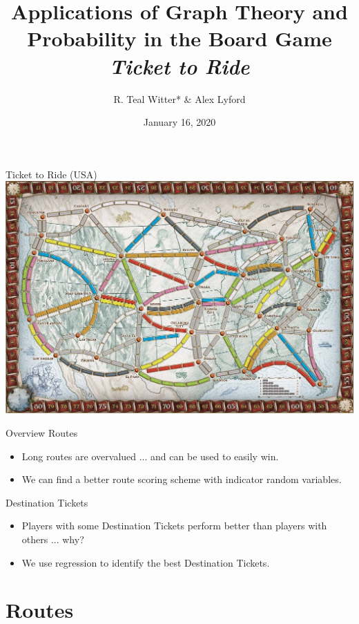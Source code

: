 \documentclass[12pt]{beamer}
\title{Applications of Graph Theory and Probability
in the Board Game \textit{Ticket to Ride}}
\author{R. {\color{teal} Teal} Witter* \& Alex Lyford}
\institute{Middlebury College}
\date{January 16, 2020}
\begin{document}
\frame{\titlepage}

\begin{frame}{Ticket to Ride (USA)}
    \centering
    \includegraphics[scale=.3]{figures/board}
\end{frame}

\begin{frame}{Overview}
    Routes
    \begin{itemize}
        \item Long routes are overvalued ... and can 
        be used to easily win.
        \item We can find a better route scoring scheme 
        with indicator random variables.
    \end{itemize}
    
    Destination Tickets
    \begin{itemize}
        \item Players with some Destination Tickets perform
        better than players with others ... why?
        \item We use regression to identify
        the best Destination Tickets.
    \end{itemize}
    
\end{frame}

\section{Routes}
\end{document}
